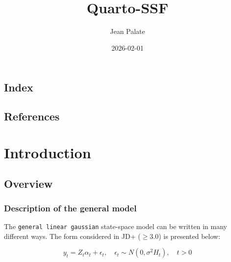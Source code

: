 \documentclass[
  letterpaper,
  DIV=11,
  numbers=noendperiod]{scrreprt}
\title{Quarto-SSF}
\author{Jean Palate}
\date{2026-02-01}
\renewcommand*\contentsname{Table of contents}
\newcommand\contentsname{Table of contents}
\begin{document}
\maketitle

\renewcommand*\contentsname{Table of contents}
{
\hypersetup{linkcolor=}
\setcounter{tocdepth}{2}
\tableofcontents
}


\chapter*{Index}\label{index}



\chapter{}\label{section}


\chapter*{References}\label{references}


\label{refs}

\part{Introduction}

\chapter{Overview}\label{overview}

\section{Description of the general
model}\label{description-of-the-general-model}

The \texttt{general\ linear\ gaussian} state-space model can be written
in many different ways. The form considered in JD+ (\(\ge 3.0\)) is
presented below:

\[ y_t = Z_t \alpha_t + \epsilon_t,\quad \epsilon_t \sim N\left(0, \sigma^2 H_t\right),\quad t> 0\]
\end{document}
